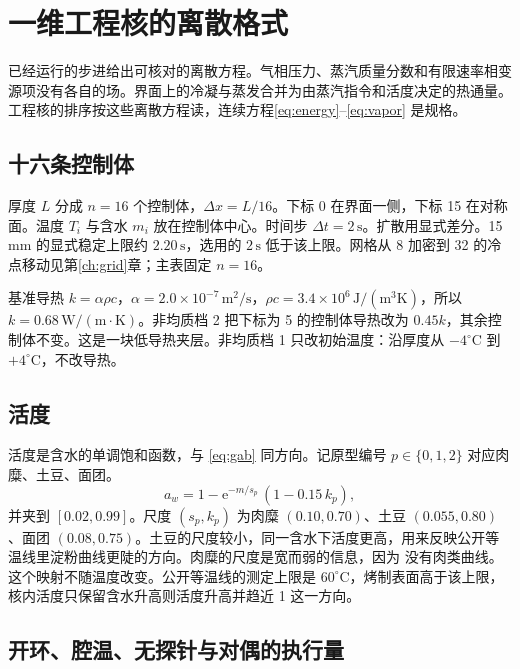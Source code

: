 \chapter{一维工程核的离散格式}
\label{app:discrete}

已经运行的步进给出可核对的离散方程。气相压力、蒸汽质量分数和有限速率相变源项没有各自的场。界面上的冷凝与蒸发合并为由蒸汽指令和活度决定的热通量。工程核的排序按这些离散方程读，连续方程\eqref{eq:energy}--\eqref{eq:vapor} 是规格。

\section{十六条控制体}

厚度 \(L\) 分成 \(n=16\) 个控制体，\(\Delta x=L/16\)。下标 0 在界面一侧，下标 15 在对称面。温度 \(T_{i}\) 与含水 \(m_{i}\) 放在控制体中心。时间步 \(\Delta t=2\,\mathrm{s}\)。扩散用显式差分。15 mm 的显式稳定上限约 \(2.20\,\mathrm{s}\)，选用的 \(2\,\mathrm{s}\) 低于该上限。网格从 8 加密到 32 的冷点移动见第\ref{ch:grid}{}章；主表固定 \(n=16\)。

基准导热 \(k=\alpha\rho c\)，\(\alpha=2.0\times 10^{-7}\,\mathrm{m}^2/\mathrm{s}\)，\(\rho c=3.4\times 10^{6}\,\mathrm{J}/(\mathrm{m}^3\mathrm{K})\)，所以 \(k=0.68\,\mathrm{W}/(\mathrm{m\cdot K})\)。非均质档 2 把下标为 5 的控制体导热改为 \(0.45k\)，其余控制体不变。这是一块低导热夹层。非均质档 1 只改初始温度：沿厚度从 \(-4^\circ\mathrm{C}\) 到 \(+4^\circ\mathrm{C}\)，不改导热。

\section{活度}

活度是含水的单调饱和函数，与 \eqref{eq:gab} 同方向。记原型编号 \(p\in\{0,1,2\}\) 对应肉糜、土豆、面团。
\begin{equation}
a_w=1-\mathrm{e}^{-m/s_p}\,(1-0.15\,k_p),
\end{equation}
并夹到 \([0.02,0.99]\)。尺度 \((s_p,k_p)\) 为肉糜 \((0.10,0.70)\)、土豆 \((0.055,0.80)\)、面团 \((0.08,0.75)\)。土豆的尺度较小，同一含水下活度更高，用来反映公开等温线里淀粉曲线更陡的方向。肉糜的尺度是宽而弱的信息，因为 \cite{sorption2026} 没有肉类曲线。这个映射不随温度改变。公开等温线的测定上限是 \(60^\circ\mathrm{C}\)，烤制表面高于该上限，核内活度只保留含水升高则活度升高并趋近 1 这一方向。

\section{开环、腔温、无探针与对偶的执行量}

